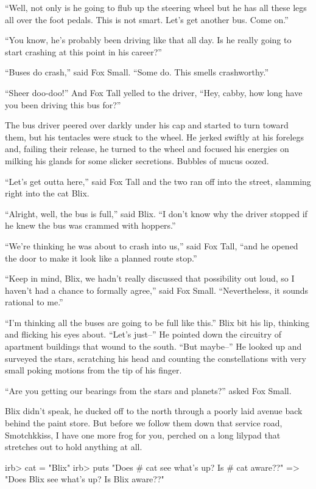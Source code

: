 \documentclass[12pt,twoside]{report}
\begin{document}
``Well, not only is he going to flub up the steering wheel but he has
all these legs all over the foot pedals.  This is not smart.  Let's
get another bus.  Come on.''

``You know, he's probably been driving like that all day.  Is he
really going to start crashing at this point in his career?''

``Buses do crash,'' said Fox Small.  ``Some do.  This smells
crashworthy.''

``Sheer doo-doo!''  And Fox Tall yelled to the driver, ``Hey, cabby,
how long have you been driving this bus for?''

The bus driver peered over darkly under his cap and started to turn
toward them, but his tentacles were stuck to the wheel.  He jerked
swiftly at his forelegs and, failing their release, he turned to the
wheel and focused his energies on milking his glands for some slicker
secretions.  Bubbles of mucus oozed.

``Let's get outta here,'' said Fox Tall and the two ran off into the
street, slamming right into the cat Blix.

``Alright, well, the bus is full,'' said Blix.  ``I don't know why the
driver stopped if he knew the bus was crammed with hoppers.''

``We're thinking he was about to crash into us,'' said Fox Tall, ``and
he opened the door to make it look like a planned route stop.''

``Keep in mind, Blix, we hadn't really discussed that possibility out
loud, so I haven't had a chance to formally agree,'' said Fox Small.
``Nevertheless, it sounds rational to me.''

``I'm thinking all the buses are going to be full like this.''  Blix
bit his lip, thinking and flicking his eyes about.  ``Let's just--''
He pointed down the circuitry of apartment buildings that wound to the
south.  ``But maybe--'' He looked up and surveyed the stars,
scratching his head and counting the constellations with very small
poking motions from the tip of his finger.

``Are you getting our bearings from the stars and planets?'' asked Fox
Small.

Blix didn't speak, he ducked off to the north through a poorly laid
avenue back behind the paint store. But before we follow them down
that service road, Smotchkkiss, I have one more frog for you, perched
on a long lilypad that stretches out to hold anything at all.


\begin{consolecode}

 irb> cat = "Blix"
 irb> puts "Does #{ cat } see what's up?  Is #{ cat } aware??"
   => "Does Blix see what's up?  Is Blix aware??"

\end{consolecode}
\end{document}
